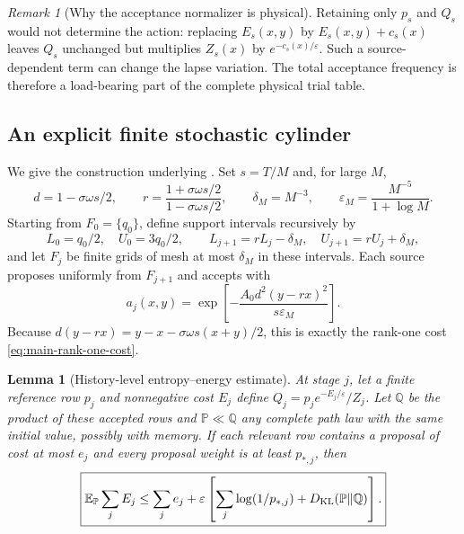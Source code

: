 \documentclass[11pt]{article}
\newtheorem{lemma}[lemma]{Lemma}
\theoremstyle{definition}
\theoremstyle{remark}
\newtheorem{remark}[remark]{Remark}
\begin{document}
\begin{remark}[Why the acceptance normalizer is physical]
Retaining only $p_s$ and $Q_s$ would not determine the action: replacing
$E_s(x,y)$ by $E_s(x,y)+c_s(x)$ leaves $Q_s$ unchanged but multiplies $Z_s(x)$
by $e^{-c_s(x)/\varepsilon}$.  Such a source-dependent term can change the
lapse variation.  The total acceptance frequency is therefore a load-bearing
part of the complete physical trial table.
\end{remark}

\subsection{An explicit finite stochastic cylinder}

We give the construction underlying
.  Set $s=T/M$ and, for large $M$,
\begin{equation}
 d=1-\sigma\omega s/2,\qquad
 r=\frac{1+\sigma\omega s/2}{1-\sigma\omega s/2},\qquad
 \delta_M=M^{-3},\qquad
 \varepsilon_M=\frac{M^{-5}}{1+\log M}.
 \label{eq:supp-explicit-scales}
\end{equation}
Starting from $F_0=\{q_0\}$, define support intervals recursively by
\[
 L_0=q_0/2,\quad U_0=3q_0/2,\qquad
 L_{j+1}=rL_j-\delta_M,\quad U_{j+1}=rU_j+\delta_M,
\]
and let $F_j$ be finite grids of mesh at most $\delta_M$ in these intervals.
Each source proposes uniformly from $F_{j+1}$ and accepts with
\begin{equation}
 a_j(x,y)=\exp\left[-\frac{A_0d^2(y-rx)^2}{s\varepsilon_M}\right].
 \label{eq:supp-explicit-acceptance}
\end{equation}
Because
$d(y-rx)=y-x-\sigma\omega s(x+y)/2$, this is exactly the rank-one cost
\eqref{eq:main-rank-one-cost}.

\begin{lemma}[History-level entropy--energy estimate]
\label{lem:supp-entropy-energy}
At stage $j$, let a finite reference row $p_j$ and nonnegative cost $E_j$ define
$Q_j=p_je^{-E_j/\varepsilon}/Z_j$.  Let $\mathbb Q$ be the product of these
accepted rows and $\mathbb P\ll\mathbb Q$ any complete path law with the same
initial value, possibly with memory.  If each relevant row contains a proposal
of cost at most $e_j$ and every proposal weight is at least $p_{*,j}$, then
\begin{equation}
 \boxed{
 \mathbb E_{\mathbb P}\sum_jE_j
 \le\sum_je_j+\varepsilon\left[
 \sum_j\log(1/p_{*,j})+D_{\rm KL}(\mathbb P\Vert\mathbb Q)\right].}
 \label{eq:supp-entropy-energy}
\end{equation}
\end{lemma}
\end{document}
